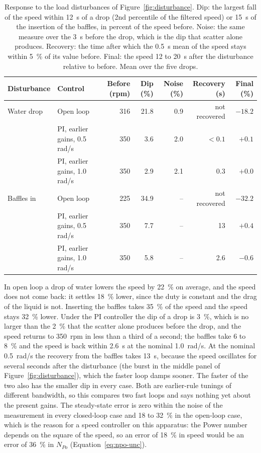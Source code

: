 \begin{table}[htbp]
    \centering
    \caption[Disturbance rejection, open loop against PI]{Response to the load disturbances of Figure~\ref{fig:disturbance}. Dip: the largest fall of the speed within 12~s of a drop (2nd percentile of the filtered speed) or 15~s of the insertion of the baffles, in percent of the speed before. Noise: the same measure over the 3~s before the drop, which is the dip that scatter alone produces. Recovery: the time after which the 0.5~s mean of the speed stays within 5~\% of its value before. Final: the speed 12 to 20~s after the disturbance relative to before. Mean over the five drops.}
    \label{tab:disturbance}
    \small
    \begin{tabular}{@{}llrrrrr@{}}
        \toprule
        Disturbance & Control & Before (rpm) & Dip (\%) & Noise (\%) & Recovery (s) & Final (\%) \\
        \midrule
        Water drop & Open loop & 316 & 21.8 & 0.9 & not recovered & $-18.2$ \\
        & PI, earlier gains, 0.5 rad/s & 350 & 3.6 & 2.0 & $<0.1$ & $+0.1$ \\
        & PI, earlier gains, 1.0 rad/s & 350 & 2.9 & 2.1 & 0.3 & $+0.0$ \\
        Baffles in & Open loop & 225 & 34.9 & -- & not recovered & $-32.2$ \\
        & PI, earlier gains, 0.5 rad/s & 350 & 7.7 & -- & 13 & $+0.4$ \\
        & PI, earlier gains, 1.0 rad/s & 350 & 5.8 & -- & 2.6 & $-0.6$ \\
        \bottomrule
    \end{tabular}
\end{table}

In open loop a drop of water lowers the speed by 22~\% on average, and the speed does not come back: it settles 18~\% lower, since the duty is constant and the drag of the liquid is not. Inserting the baffles takes 35~\% of the speed and the speed stays 32~\% lower. Under the PI controller the dip of a drop is 3~\%, which is no larger than the 2~\% that the scatter alone produces before the drop, and the speed returns to 350~rpm in less than a third of a second; the baffles take 6 to 8~\% and the speed is back within 2.6~s at the nominal 1.0~rad/s. At the nominal 0.5~rad/s the recovery from the baffles takes 13~s, because the speed oscillates for several seconds after the disturbance (the burst in the middle panel of Figure~\ref{fig:disturbance}), which the faster loop damps sooner. The faster of the two also has the smaller dip in every case. Both are earlier-rule tunings of different bandwidth, so this compares two fast loops and says nothing yet about the present gains. The steady-state error is zero within the noise of the measurement in every closed-loop case and 18 to 32~\% in the open-loop case, which is the reason for a speed controller on this apparatus: the Power number depends on the square of the speed, so an error of 18~\% in speed would be an error of 36~\% in $N_{Po}$ (Equation~\ref{eq:npo-unc}).

